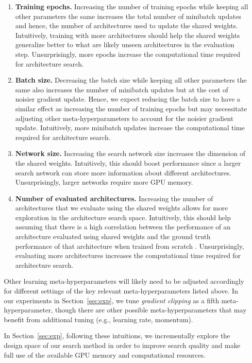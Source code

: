 \documentclass[acmlarge, nonacm]{acmart}
\begin{document}
\begin{enumerate}
    \item \textbf{Training epochs.}  Increasing the number of training epochs while keeping all other parameters the same increases the total number of minibatch updates and hence, the number of architectures used to update the shared weights.  Intuitively, training with more architectures should help the shared weights generalize better to what are likely unseen architectures in the evaluation step.  Unsurprisingly, more epochs increase the computational time required for architecture search.
    \item \textbf{Batch size.}  Decreasing the batch size while keeping all other parameters the same also increases the number of minibatch updates but at the cost of noisier gradient update.  Hence, we expect reducing the batch size to have a similar effect as increasing the number of training epochs but may necessitate adjusting other meta-hyperparameters to account for the noisier gradient update.  Intuitively, more minibatch updates increase the computational time required for architecture search.
    \item \textbf{Network size.} Increasing the search network size increases the dimension of the shared weights.  Intuitively, this should boost performance since a larger search network can store more information about different architectures.  Unsurprisingly, larger networks require more GPU memory.
    \item \textbf{Number of evaluated architectures.}  Increasing the number of architectures that we evaluate using the shared weights allows for more exploration in the architecture search space.  Intuitively, this should help assuming that there is a high correlation between the performance of an architecture evaluated using shared weights and the ground truth performance of that architecture when trained from scratch \citep{bender2018understanding}.  Unsurprisingly, evaluating more architectures increases the computational time required for architecture search. 
\end{enumerate}
Other learning meta-hyperparameters will likely need to be adjusted accordingly for different settings of the key relevant meta-hyperparameters listed above. In our experiments in Section~\ref{sec:exp}, we tune \emph{gradient clipping} as a fifth meta-hyperparameter, though there are other possible meta-hyperparameters that may benefit from additional tuning (e.g., learning rate, momentum).

In Section~\ref{sec:exp}, following these intuitions, we incrementally explore the design space of our search method in order to improve search quality and make full use of the available GPU memory and computational resources. 
\end{document}
